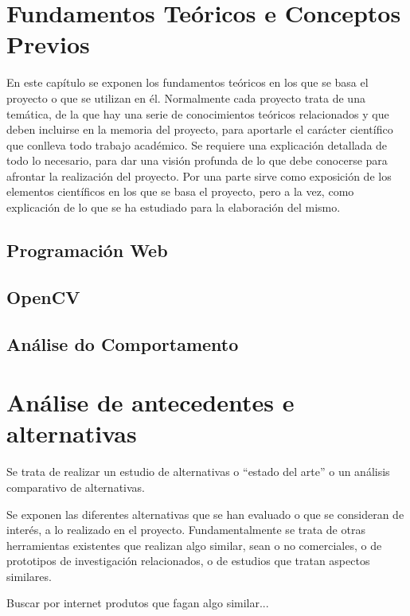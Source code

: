 \chapter{Fundamentos Teóricos e Conceptos Previos}

En este capítulo se exponen los fundamentos teóricos en los que se basa el proyecto o que se
utilizan en él.
Normalmente cada proyecto trata de una temática, de la que hay una serie de conocimientos
teóricos relacionados y que deben incluirse en la memoria del proyecto, para aportarle el carácter
científico que conlleva todo trabajo académico.
Se requiere una explicación detallada de todo lo necesario, para dar una visión profunda de lo
que debe conocerse para afrontar la realización del proyecto. Por una parte sirve como exposición
de los elementos científicos en los que se basa el proyecto, pero a la vez, como explicación de lo
que se ha estudiado para la elaboración del mismo.

  \section{Programación Web}

  \section{OpenCV}

  \section{Análise do Comportamento}
  
\chapter{Análise de antecedentes e alternativas}
	Se trata de realizar un estudio de alternativas o “estado del arte” o un análisis comparativo
	de alternativas.

	Se exponen las diferentes alternativas que se han evaluado o que se consideran de interés, a
	lo realizado en el proyecto. Fundamentalmente se trata de otras herramientas existentes 
	que realizan algo similar, sean o no comerciales, o de prototipos de investigación relacionados,
	o de estudios que tratan aspectos similares.

	Buscar por internet produtos que fagan algo similar...